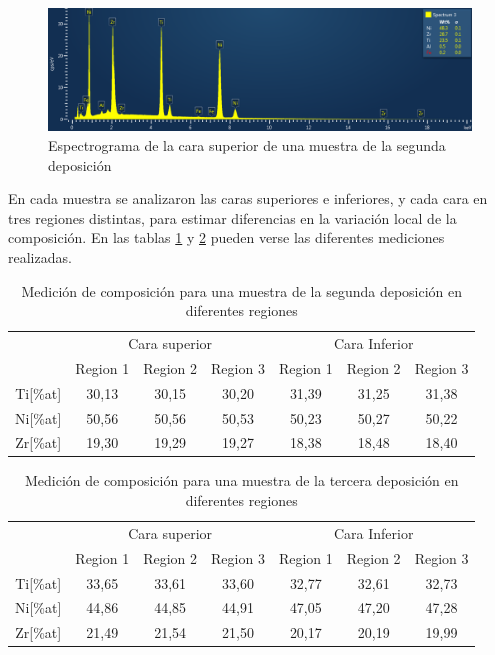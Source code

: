 \documentclass{article}
\theoremstyle{definition}
\theoremstyle{remark}
\begin{document}
 \begin{figure}[H]
 	\centering
	\includegraphics[scale=0.5]{img/dep2.png}
 	\caption{Espectrograma de la cara superior de una muestra de la segunda deposición}
	\label{dep2}
\end{figure} 

En cada muestra se analizaron las caras superiores e inferiores, y cada cara en tres regiones distintas, para estimar diferencias en la variación local de la composición. En las tablas \ref{composition2} y \ref{composition3} pueden verse las diferentes mediciones realizadas.

\begin{table}[H]
\begin{tabular}{c|c|c|c|c|c|c|}
\cline{2-7}
\multicolumn{1}{l|}{} & \multicolumn{3}{c|}{Cara superior} & \multicolumn{3}{c|}{Cara Inferior} \\ \cline{2-7} 
\multicolumn{1}{l|}{} & Region 1 & Region 2 & Region 3 & Region 1 & Region 2 & Region 3 \\ \hline
\multicolumn{1}{|c|}{Ti{[}\%at{]}} & 30,13 & 30,15 & 30,20 & 31,39 & 31,25 & 31,38 \\ \hline
\multicolumn{1}{|c|}{Ni{[}\%at{]}} & 50,56 & 50,56 & 50,53 & 50,23 & 50,27 & 50,22 \\ \hline
\multicolumn{1}{|c|}{Zr{[}\%at{]}} & 19,30 & 19,29 & 19,27 & 18,38 & 18,48 & 18,40 \\ \hline
\end{tabular}
\caption{Medición de composición para una muestra de la segunda deposición en diferentes regiones}
\label{composition2}
\end{table}

\begin{table}[H]
\begin{tabular}{c|c|c|c|c|c|c|}
\cline{2-7}
\multicolumn{1}{l|}{} & \multicolumn{3}{c|}{Cara superior} & \multicolumn{3}{c|}{Cara Inferior} \\ \cline{2-7} 
\multicolumn{1}{l|}{} & Region 1 & Region 2 & Region 3 & Region 1 & Region 2 & Region 3 \\ \hline
\multicolumn{1}{|c|}{Ti{[}\%at{]}} & 33,65 & 33,61 & 33,60 & 32,77 & 32,61 & 32,73 \\ \hline
\multicolumn{1}{|c|}{Ni{[}\%at{]}} & 44,86 & 44,85 & 44,91 & 47,05 & 47,20 & 47,28 \\ \hline
\multicolumn{1}{|c|}{Zr{[}\%at{]}} & 21,49 & 21,54 & 21,50 & 20,17 & 20,19 & 19,99 \\ \hline
\end{tabular}
\caption{Medición de composición para una muestra de la tercera deposición en diferentes regiones}
\label{composition3}
\end{table}
\end{document}
